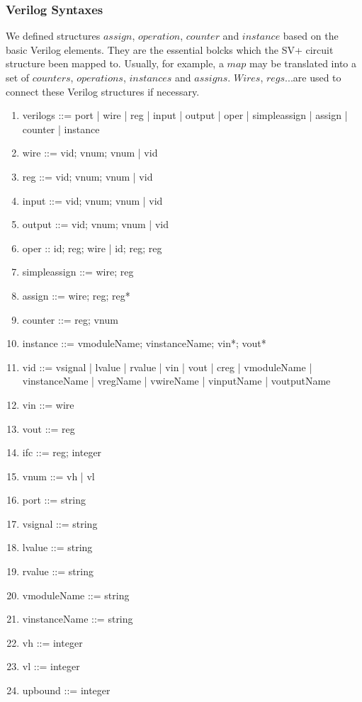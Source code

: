 \subsubsection{Verilog Syntaxes}
\normalfont
We defined structures $assign$, $operation$, $counter$ and $instance$ based on the basic Verilog elements. They are the essential bolcks which the SV+ circuit structure been mapped to. Usually, for example, a $map$ may be translated into a set of $counters$, $operations$, $instances$ and $assigns$. $Wires$, $regs$...are used to connect these Verilog structures if necessary.
\itshape
\begin{enumerate}\itemsep2pt \parskip0pt 
  \item verilogs ::= port | wire | reg | input | output |
                     oper | simpleassign | assign | 
                     counter | instance
  \item wire ::= vid; vnum; vnum | vid
  \item reg ::= vid; vnum; vnum | vid
  \item input ::= vid; vnum; vnum | vid
  \item output ::= vid; vnum; vnum | vid
  \item oper :: id; reg; wire | id; reg; reg
  \item simpleassign ::= wire; reg
  \item assign ::= wire; reg; reg*
  \item counter ::= reg; vnum
  \item instance ::= vmoduleName; vinstanceName; vin*; vout*
  \item vid ::= vsignal | lvalue | rvalue | vin 
                | vout | creg | vmoduleName 
                | vinstanceName | vregName | vwireName 
                | vinputName | voutputName
  \item vin ::= wire
  \item vout ::= reg
  \item ifc ::= reg; integer
  \item vnum ::= vh | vl
  \item port ::= string
  \item vsignal ::= string
  \item lvalue ::= string
  \item rvalue ::= string
  \item vmoduleName ::= string
  \item vinstanceName ::= string 
  \item vh ::= integer
  \item vl ::= integer
  \item upbound ::= integer
\end{enumerate}
